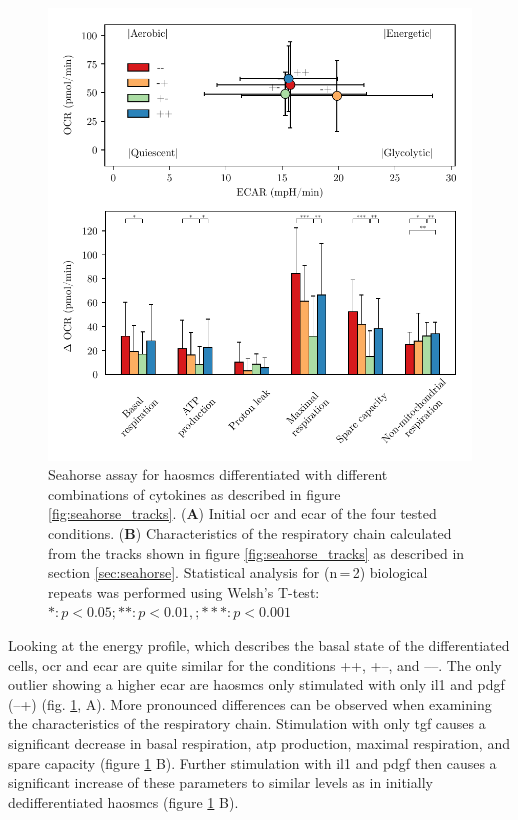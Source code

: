     \begin{figure}[h!]
    \capstart
        \centering
    	\includegraphics{Abbildung/Seahorse_summary_merged.pdf}

    	\begin{minipage}{\captionwidth}
    		\caption[energy_profile]{ \newline Seahorse assay for \acp{haosmc} differentiated with different combinations of cytokines as described in figure \ref{fig:seahorse_tracks}.
            (\textbf{A}) Initial \ac{ocr} and \ac{ecar} of the four tested conditions. (\textbf{B}) Characteristics of the respiratory chain calculated from the tracks shown in figure \ref{fig:seahorse_tracks} as described in section \ref{sec:seahorse}. Statistical analysis for (n\,=\,2) biological repeats was performed using Welsh's T-test: $*: p < 0.05; **: p < 0.01, ; ***: p < 0.001$}
    		\label{fig:energy_profile}
    	\end{minipage}
    \end{figure}

    \pagebreak
    Looking at the energy profile, which describes the basal state of the differentiated cells, \ac{ocr} and \ac{ecar} are quite similar for the conditions ++, +–, and ––. The only outlier showing a higher \ac{ecar} are \acp{haosmc} only stimulated with only \ac{il1} and \ac{pdgf} (–+) (fig. \ref{fig:energy_profile}, A). More pronounced differences can be observed when examining the characteristics of the respiratory chain. Stimulation with only \ac{tgf} causes a significant decrease in basal respiration, \ac{atp} production, maximal respiration, and spare capacity (figure \ref{fig:energy_profile} B). Further stimulation with \ac{il1} and \ac{pdgf} then causes a significant increase of these parameters to similar levels as in initially dedifferentiated \acp{haosmc} (figure \ref{fig:energy_profile} B).

